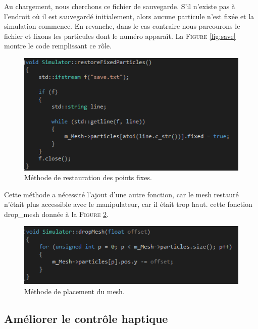\documentclass[a4paper,12pt]{article}
\begin{document}
Au chargement, nous cherchons ce fichier de sauvegarde. S'il n'existe pas à l'endroit où il est sauvegardé initialement, alors aucune particule n'est fixée et la simulation commence. En revanche, dans le cas contraire nous parcourons le fichier et fixons les particules dont le numéro apparaît. La \textsc{Figure} \ref{fig:save} montre le code remplissant ce rôle.
\begin{figure}[ht!]
  \centering
  \includegraphics{images/restore.png}
  \caption{Méthode de restauration des points fixes.}
  \label{fig:restore}
\end{figure}

Cette méthode a nécessité l'ajout d'une autre fonction, car le mesh restauré n'était plus accessible avec le manipulateur, car il était trop haut. cette fonction \og{}drop\_mesh\fg{} donnée à la \textsc{Figure} \ref{fig:drop}.
\begin{figure}[ht!]
	\centering
  \includegraphics{images/drop.png}
  \caption{Méthode de placement du mesh.}
  \label{fig:drop}
\end{figure}

\subsection{Améliorer le contrôle haptique}
\end{document}
